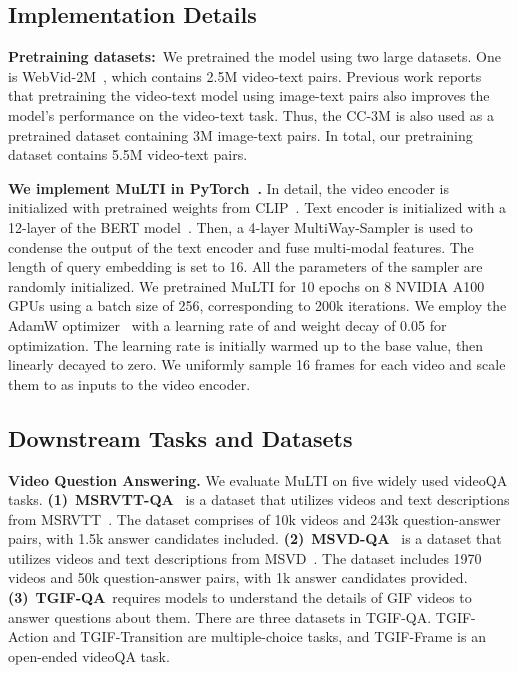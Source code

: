 \documentclass[10pt,twocolumn,letterpaper]{article}
\begin{document}
\vspace{-1ex}
\subsection{Implementation Details}\label{sec:method-impl}
\vspace{-0.5ex}

\textbf{Pretraining datasets:}~We pretrained the model using two large datasets. One is WebVid-2M~\cite{Bain2021FrozenIT}, which contains 2.5M video-text pairs. Previous work reports~\cite{Lei2021Less} that pretraining the video-text model using image-text pairs also improves the model's performance on the video-text task. Thus, the CC-3M\cite{Sharma2018ConceptualCA} is also used as a pretrained dataset containing 3M image-text pairs. In total, our pretraining dataset contains 5.5M video-text pairs.

\textbf{We implement MuLTI in PyTorch~\cite{paszke2019pytorch}.} In detail, the video encoder is initialized with pretrained weights from CLIP~\cite{Radford2021LearningTV}. Text encoder is initialized with a 12-layer of the BERT model~\cite{Devlin2018Bert}. 
Then, a 4-layer MultiWay-Sampler is used to condense the output of the text encoder and fuse multi-modal features.
The length of query embedding is set to 16. 
All the parameters of the sampler are randomly initialized. 
We pretrained MuLTI for 10 epochs on 8 NVIDIA A100 GPUs using a batch size of 256, corresponding to 200k iterations. 
We employ the AdamW optimizer~\cite{Adamw2018} with a learning rate of  and weight decay of 0.05 for optimization. The learning rate is initially warmed up to the base value, then linearly decayed to zero.
We uniformly sample 16 frames for each video and scale them to  as inputs to the video encoder.

\vspace{-1ex}
\subsection{Downstream Tasks and Datasets}\label{sec:exp-setup}
\vspace{-0.5ex}

\textbf{Video Question Answering.} We evaluate MuLTI on five widely used videoQA tasks.
\textbf{(1)}~\textbf{MSRVTT-QA}~\cite{xu2017video} is a dataset that utilizes videos and text descriptions from MSRVTT~\cite{Xu2016Msr}. The dataset comprises of 10k videos and 243k question-answer pairs, with 1.5k answer candidates included.
\textbf{(2)}~\textbf{MSVD-QA}~\cite{xu2017video} is a dataset that utilizes videos and text descriptions from MSVD~\cite{chen2011collecting}. The dataset includes 1970 videos and 50k question-answer pairs, with 1k answer candidates provided.
\textbf{(3)}~\textbf{TGIF-QA\cite{Jang2017TGIFQATS}}~requires models to understand the details of GIF videos to answer questions about them. There are three datasets in TGIF-QA. TGIF-Action and TGIF-Transition are multiple-choice tasks, and TGIF-Frame is an open-ended videoQA task. 
\end{document}
